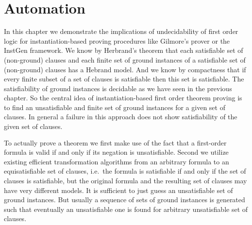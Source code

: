 
\chapter{Automation}



In this chapter we demonstrate the implications of undecidability of first order logic 
for instantiation-based proving procedures like Gilmore's prover or the InstGen framework.
%
We know by Herbrand's theorem 
that each satisfiable set of (non-ground) clauses
and each finite set of ground instances of a satisfiable set of (non-ground) clauses
has a Hebrand model. 
And we know by compactness 
that if every finite subset of a set of clauses is satisfiable then this set is satisfiable.
The satisfiability of ground instances is decidable as we have seen in the previous chapter.
So the central idea of instantiation-based first order theorem proving 
is to find an unsatisfiable and finite set of ground instances for a given set of clauses.
In general a failure in this approach does not show satisfiability of the given set of clauses.


To actually prove a theorem 
we first make use of the fact that a first-order formula is valid if and only if its negation is unsatisfiable.
Second we utilize existing efficient transformation algorithms \cite{tseitin70, PLAISTED1986293}
from an arbitrary formula to an equisatisfiable set of clauses, 
i.e.~the formula is satisfiable if and only if the set of clauses is satisfiable, 
but the original formula and the resulting set of clauses may have very different models.
It is sufficient to just guess an unsatisfiable set of ground instances. 
But usually a sequence of sets of ground instances is generated 
such that eventually an unsatisfiable one is found for arbitrary unsatisfiable set of clauses.



%
%
%
%
%




